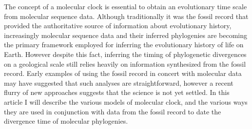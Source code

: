The concept of a molecular clock is essential to obtain an evolutionary time scale from molecular sequence data.
Although traditionally it was the fossil record that provided the authoritative source of information about evolutionary history, increasingly molecular sequence data and their inferred phylogenies are becoming the primary framework employed for inferring the evolutionary history of life on Earth. However despite this fact, inferring the timing of phylogenetic divergences on a geological scale still relies heavily on information synthesized from the fossil record. Early examples of using the fossil record in concert with molecular data may have suggested that such analyses are straightforward, however a recent flurry of new approaches suggests that the science is not yet settled. In this article I will describe the various models of molecular clock, and the various ways they are used in conjunction with data from the fossil record to date the divergence time of molecular phylogenies.
  